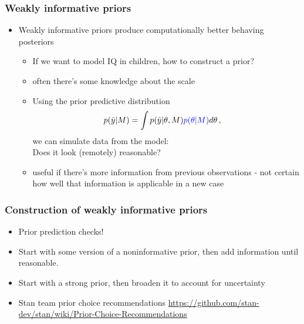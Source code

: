 \documentclass[10pt]{beamer}
\begin{document}
\begin{frame}
\frametitle{Weakly informative priors}

  \begin{itemize}
  \item Weakly informative priors produce computationally better
    behaving posteriors
    \begin{itemize}
    \item If we want to model IQ in children, how to construct a prior? %
    \pause
    \item often there's some knowledge about the scale
    \item Using the {\color{blue} prior predictive} distribution
    \begin{align*}
      p(\tilde{y}|M) &= \int p(\tilde{y}|\theta,M){\color{blue}p(\theta|M)}d\theta\,,
    \end{align*}
    we can simulate data from the model: \\{\color{uured}Does it look (remotely) reasonable?}
    \item useful if there's more information from previous
      observations - not certain how well that information is
      applicable in a new case
    \end{itemize}
  \end{itemize}

\end{frame}

\begin{frame}
\frametitle{Construction of weakly informative priors}

  \begin{itemize}
      \item Prior prediction checks!
      \item Start with some version of a noninformative prior, then add  information until reasonable.
      \item Start with a strong prior, then broaden it to account for uncertainty
      \pause
    \item Stan team prior choice recommendations \url{https://github.com/stan-dev/stan/wiki/Prior-Choice-Recommendations}
  \end{itemize}

\end{frame}
\end{document}
